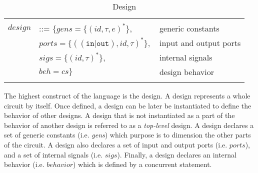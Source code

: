 \begin{table}[!htbp]
  \caption{Design}
  \label{tab:design}
  \begin{tabular}{|rll|}
    \hline
    & & \\
    $design$ & ::= $\{{}gens=\{(id,\tau,e)^{*}\},$ & generic constants \\
    & \quad\quad${}ports=\{((\mathtt{in}\vert\mathtt{out}),id,\tau)^{*}\},$ & input and output ports \\
    & \quad\quad${}sigs=\{(id,\tau)^{*}\},$ & internal signals \\
    & \quad\quad${}beh=cs\}$ & design behavior \\
    & & \\
    \hline
  \end{tabular}
\end{table}

The highest construct of the \hvhdl{} language is the design. A design
represents a whole circuit by itself. Once defined, a design can be
later be instantiated to define the behavior of other designs. A
design that is not instantiated as a part of the behavior of another
design is referred to as a \textit{top-level} design. A design
declares a set of generic constants (i.e. \textit{gens}) which purpose
is to dimension the other parts of the circuit. A design also declares
a set of input and output ports (i.e. $ports$), and a set of internal
signals (i.e. $sigs$). Finally, a design declares an internal behavior
(i.e. $behavior$) which is defined by a concurrent statement.

